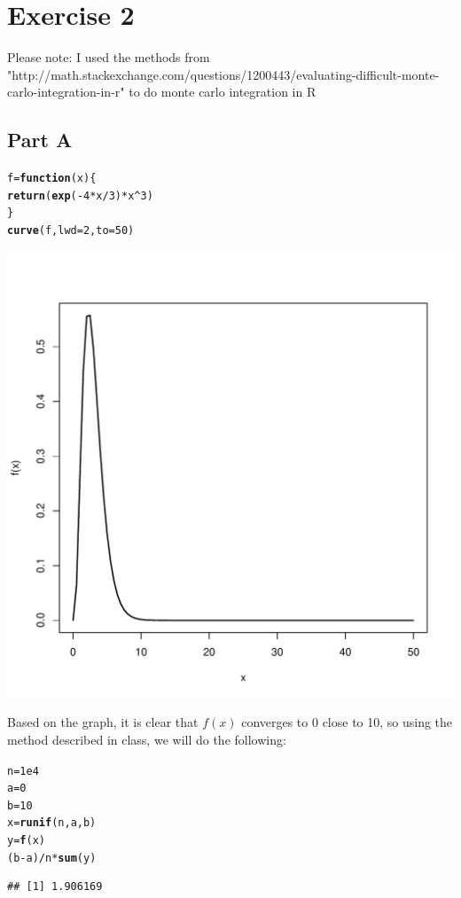 \documentclass{article}\usepackage[]{graphicx}\usepackage[]{color}
\makeatletter
\newcommand{\hlnum}[1]{\textcolor[rgb]{0.686,0.059,0.569}{#1}}%
\newcommand{\hlopt}[1]{\textcolor[rgb]{0,0,0}{#1}}%
\newcommand{\hlstd}[1]{\textcolor[rgb]{0.345,0.345,0.345}{#1}}%
\newcommand{\hlkwa}[1]{\textcolor[rgb]{0.161,0.373,0.58}{\textbf{#1}}}%
\newcommand{\hlkwb}[1]{\textcolor[rgb]{0.69,0.353,0.396}{#1}}%
\newcommand{\hlkwc}[1]{\textcolor[rgb]{0.333,0.667,0.333}{#1}}%
\newcommand{\hlkwd}[1]{\textcolor[rgb]{0.737,0.353,0.396}{\textbf{#1}}}%
\newenvironment{kframe}{%
 \def\at@end@of@kframe{}%
 \ifinner\ifhmode%
  \def\at@end@of@kframe{\end{minipage}}%
  \begin{minipage}{\columnwidth}%
 \fi\fi%
 \def\FrameCommand##1{\hskip\@totalleftmargin \hskip-\fboxsep
 \colorbox{shadecolor}{##1}\hskip-\fboxsep
     \hskip-\linewidth \hskip-\@totalleftmargin \hskip\columnwidth}%
 \MakeFramed {\advance\hsize-\width
   \@totalleftmargin\z@ \linewidth\hsize
   \@setminipage}}%
 {\par\unskip\endMakeFramed%
 \at@end@of@kframe}
\newenvironment{knitrout}{}{} %
\makeatother
\begin{document}
\section*{Exercise 2}
Please note: I used the methods from "http://math.stackexchange.com/questions/1200443/evaluating-difficult-monte-carlo-integration-in-r" to do monte carlo integration in R
\subsection*{Part A}
\begin{knitrout}
\color{fgcolor}\begin{kframe}
\begin{alltt}
\hlstd{f} \hlkwb{=} \hlkwa{function}\hlstd{(}\hlkwc{x}\hlstd{)\{}
  \hlkwd{return}\hlstd{(}\hlkwd{exp}\hlstd{(}\hlopt{-}\hlnum{4}\hlopt{*}\hlstd{x}\hlopt{/}\hlnum{3}\hlstd{)}\hlopt{*}\hlstd{x}\hlopt{^}\hlnum{3}\hlstd{)}
\hlstd{\}}
\hlkwd{curve}\hlstd{(f,} \hlkwc{lwd}\hlstd{=}\hlnum{2}\hlstd{,}\hlkwc{to} \hlstd{=} \hlnum{50}\hlstd{)}
\end{alltt}
\end{kframe}
\includegraphics[width=0.60\linewidth]{figure/unnamed-chunk-3-1} 

\end{knitrout}
Based on the graph, it is clear that $f(x)$ converges to 0 close to 10, so using the method described in class, we will do the following:
\begin{knitrout}
\color{fgcolor}\begin{kframe}
\begin{alltt}
\hlstd{n} \hlkwb{=} \hlnum{1e4}
\hlstd{a} \hlkwb{=} \hlnum{0}
\hlstd{b} \hlkwb{=} \hlnum{10}
\hlstd{x} \hlkwb{=} \hlkwd{runif}\hlstd{(n, a, b)}
\hlstd{y} \hlkwb{=} \hlkwd{f}\hlstd{(x)}
\hlstd{(b}\hlopt{-}\hlstd{a)}\hlopt{/}\hlstd{n}\hlopt{*}\hlkwd{sum}\hlstd{(y)}
\end{alltt}
\begin{verbatim}
## [1] 1.906169
\end{verbatim}
\end{kframe}
\end{knitrout}
\end{document}
